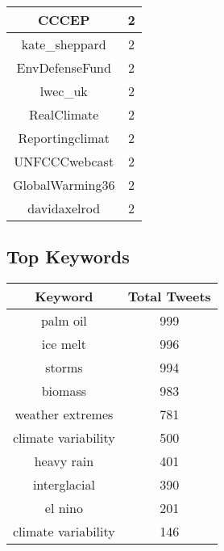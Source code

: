 \documentclass{article}\usepackage[T1]{fontenc}
\begin{document}
\begin{tabular}{|c|c|}
CCCEP & 2\\ 
 \hline
kate\_sheppard & 2\\ 
 \hline
EnvDefenseFund & 2\\ 
 \hline
lwec\_uk & 2\\ 
 \hline
RealClimate & 2\\ 
 \hline
Reportingclimat & 2\\ 
 \hline
UNFCCCwebcast & 2\\ 
 \hline
GlobalWarming36 & 2\\ 
 \hline
davidaxelrod & 2\\ 
 \hline
\end{tabular}\subsection*{Top Keywords}\begin{tabular}{|c|c|}         \hline         Keyword & Total Tweets \\ 
 \hline
palm oil & 999\\ 
 \hline
ice melt & 996\\ 
 \hline
storms & 994\\ 
 \hline
biomass & 983\\ 
 \hline
weather extremes & 781\\ 
 \hline
climate variability & 500\\ 
 \hline
heavy rain & 401\\ 
 \hline
interglacial & 390\\ 
 \hline
el nino & 201\\ 
 \hline
climate variability & 146\\ 
 \hline
\end{tabular}
\end{document}
